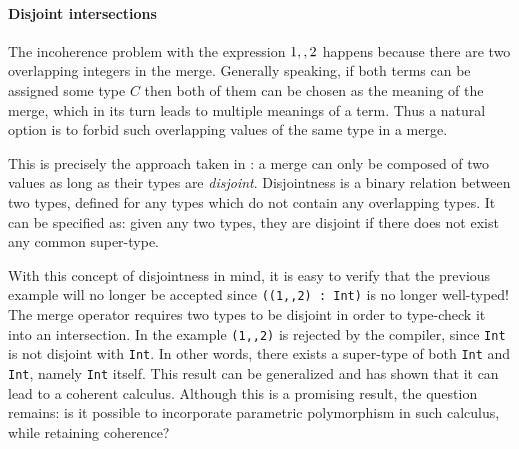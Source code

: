 \paragraph{Disjoint intersections}
The incoherence problem with the expression $1 ,, 2$
happens because there are two overlapping integers in the merge. 
Generally speaking, if both terms can be assigned some type $C$
then both of them can be chosen as the meaning of the merge,
which in its turn leads to multiple meanings of a term.
Thus a natural option is to forbid such overlapping
values of the same type in a merge.

This is precisely the approach taken in \oldname: a merge can only be composed of
two values as long as their types are \emph{disjoint}.  
Disjointness is a binary relation between two types, defined for any types which
do not contain any overlapping types.
It can be specified as: given any two types, they are disjoint if there does not 
exist any common super-type.

\begin{comment}
More formally, the notion of disjointness can be specified as follows:
\bruno{I think we should avoid presenting the specification, since we
  do not have one for this paper. We can refer to this in the related
  work.}

\begin{definition}[Disjointness]
  Given two types $A$ and $B$, two types are disjoint
  (written $A \disjoint B$) if there is no type $C$ such that both $A$ and $B$ are
  subtypes of $C$:
  \[A \disjoint B \equiv \not\exists C.~A \subtype C \wedge B \subtype C\]
\end{definition}
\end{comment}

With this concept of disjointness in mind, it is easy to verify that the previous example 
will no longer be accepted since \lstinline$((1,,2) : Int)$ is no longer well-typed!
The merge operator requires two types to be disjoint in order to type-check it into
an intersection.
In the example \lstinline$(1,,2)$ is rejected by the compiler, since \lstinline$Int$ is not
disjoint with \lstinline$Int$.
In other words, there exists a super-type of both \lstinline$Int$ and \lstinline$Int$, 
namely \lstinline$Int$ itself.
This result can be generalized and \oldname has shown that it can lead to a coherent calculus. 
Although this is a promising result, the question remains: is it possible to incorporate 
parametric polymorphism in such calculus, while retaining coherence?


